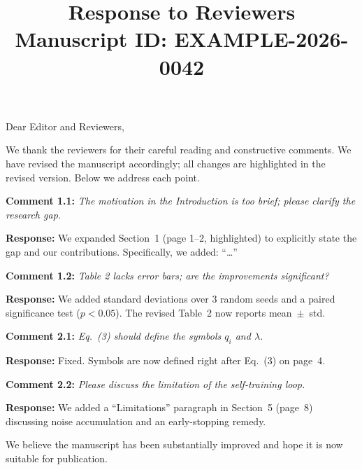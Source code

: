 \documentclass[11pt]{article}
\title{\vspace{-1.2cm}\bfseries Response to Reviewers\\[4pt]
\large Manuscript ID: EXAMPLE-2026-0042}
\author{}
\date{}
\newcommand{\reviewer}[1]{\vspace{8pt}\noindent{\large\bfseries #1}\par}
\newcommand{\comment}[2]{\vspace{5pt}\noindent\textbf{\textcolor{blue!60!black}{Comment #1:}} \textit{#2}\par}
\newcommand{\response}[1]{\vspace{3pt}\noindent\textbf{\textcolor{replied}{Response:}} #1\par}
\begin{document}
\maketitle

Dear Editor and Reviewers,

We thank the reviewers for their careful reading and constructive
comments. We have revised the manuscript accordingly; all changes are
highlighted in the revised version. Below we address each point.

\reviewer{Reviewer \#1}

\comment{1.1}{The motivation in the Introduction is too brief; please
clarify the research gap.}

\response{We expanded Section~1 (page 1--2, highlighted) to explicitly
state the gap and our contributions. Specifically, we added: ``\ldots''
}

\comment{1.2}{Table 2 lacks error bars; are the improvements significant?}

\response{We added standard deviations over 3 random seeds and a
paired significance test ($p < 0.05$). The revised Table~2 now reports
mean~$\pm$~std.}

\reviewer{Reviewer \#2}

\comment{2.1}{Eq.~(3) should define the symbols $q_i$ and $\lambda$.}

\response{Fixed. Symbols are now defined right after Eq.~(3) on page~4.}

\comment{2.2}{Please discuss the limitation of the self-training loop.}

\response{We added a ``Limitations'' paragraph in Section~5
(page~8) discussing noise accumulation and an early-stopping remedy.}

\vspace{10pt}
\noindent We believe the manuscript has been substantially improved and
hope it is now suitable for publication.
\end{document}
